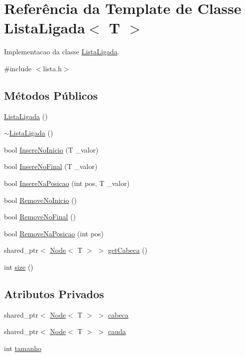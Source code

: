 \hypertarget{classListaLigada}{}\section{Referência da Template de Classe Lista\+Ligada$<$ T $>$}
\label{classListaLigada}


Implementacao da classe \hyperlink{classListaLigada}{Lista\+Ligada}.  




{\ttfamily \#include $<$lista.\+h$>$}

\subsection*{Métodos Públicos}
\begin{DoxyCompactItemize}
\item 
\hyperlink{classListaLigada_aceed3c08dcb208b4622b317c5cef104b}{Lista\+Ligada} ()
\item 
\hyperlink{classListaLigada_a2e171a163616642932b7db0c19aa5b49}{$\sim$\+Lista\+Ligada} ()
\item 
bool \hyperlink{classListaLigada_ae5c528807334f89f5fa34beab6cccebf}{Insere\+No\+Inicio} (T \+\_\+valor)
\item 
bool \hyperlink{classListaLigada_a0a7a7ca52d16deda399c51e9c32aa167}{Insere\+No\+Final} (T \+\_\+valor)
\item 
bool \hyperlink{classListaLigada_ae42913bdf31cb66ab4a0eec0e207e843}{Insere\+Na\+Posicao} (int pos, T \+\_\+valor)
\item 
bool \hyperlink{classListaLigada_a96e263fe9ff0385719a67680d2d9eadc}{Remove\+No\+Inicio} ()
\item 
bool \hyperlink{classListaLigada_a48a1b9c8e883f6db2e0d68cfd18e0793}{Remove\+No\+Final} ()
\item 
bool \hyperlink{classListaLigada_a5e47ccba3363b97c6223d8867f18bbf7}{Remove\+Na\+Posicao} (int pos)
\item 
shared\+\_\+ptr$<$ \hyperlink{classNode}{Node}$<$ T $>$ $>$ \hyperlink{classListaLigada_ad9914db162e92689debeda14f0b671da}{get\+Cabeca} ()
\item 
int \hyperlink{classListaLigada_aaa0fe8d3ea92daa521f97d5aa1936ae6}{size} ()
\end{DoxyCompactItemize}
\subsection*{Atributos Privados}
\begin{DoxyCompactItemize}
\item 
shared\+\_\+ptr$<$ \hyperlink{classNode}{Node}$<$ T $>$ $>$ \hyperlink{classListaLigada_a8923b88a26191809b8ffc8181dc20359}{cabeca}
\item 
shared\+\_\+ptr$<$ \hyperlink{classNode}{Node}$<$ T $>$ $>$ \hyperlink{classListaLigada_a7fbadfbdd19c26712c4f1045a7782804}{cauda}
\item 
int \hyperlink{classListaLigada_a7cb56d42e0603821e0b8f8645ec55ba0}{tamanho}
\end{DoxyCompactItemize}
